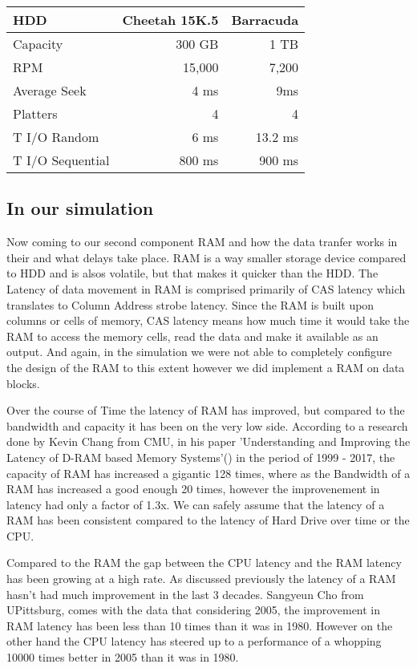 \documentclass[12pt]{article}
\begin{document}
\begin{tabular}{|l|rr|}
  \hline
  HDD & Cheetah 15K.5 & Barracuda\\
  \hline
  Capacity & 300 GB & 1 TB\\
  \hline
  RPM & 15,000 & 7,200\\
  \hline
  Average Seek & 4 ms & 9ms\\
  \hline
  Platters & 4 & 4\\
  \hline
  T I/O Random & 6 ms & 13.2 ms\\
  \hline
  T I/O Sequential & 800 ms & 900 ms\\
  \hline
\end {tabular}

\subsection*{In our simulation}

Now coming to our second component RAM and how the data tranfer works in their and what delays take place.
RAM is a way smaller storage device compared to HDD and is alsos volatile, but that makes it quicker than
the HDD. The Latency of data movement in RAM is comprised primarily of CAS latency which translates to
Column Address strobe latency. Since the RAM is built upon columns or cells of memory,
CAS latency means how much time it would take the RAM to access the memory cells, read the data and make it
available as an output. And again, in the simulation we were not able to completely configure the design of
the RAM to this extent however we did implement a RAM on data blocks.

Over the course of Time the latency of RAM has improved, but compared to the bandwidth and capacity it has
been on the very low side. According to a research done by Kevin Chang from CMU, in his paper 'Understanding
and Improving the Latency of D-RAM based Memory Systems'(\cite {DRAMTimings}) in the period of 1999 - 2017,
the capacity of RAM has increased a gigantic 128 times, where as the Bandwidth of a RAM has increased a
good enough 20 times, however the improvenement in latency had  only a factor of 1.3x. We can safely assume
that the latency of a RAM has been consistent compared to the latency of Hard Drive over time or the CPU.

Compared to the RAM the gap between the CPU latency and the RAM latency has been growing at a high rate. As
discussed previously the latency of a RAM hasn't had much improvement in the last 3 decades. Sangyeun Cho
from UPittsburg, comes with the data that considering 2005, the improvement in RAM latency has been less than
10 times than it was in 1980. However on the other hand the CPU latency has steered up to a performance of
a whopping 10000 times better in 2005 than it was in 1980.
\end{document}
